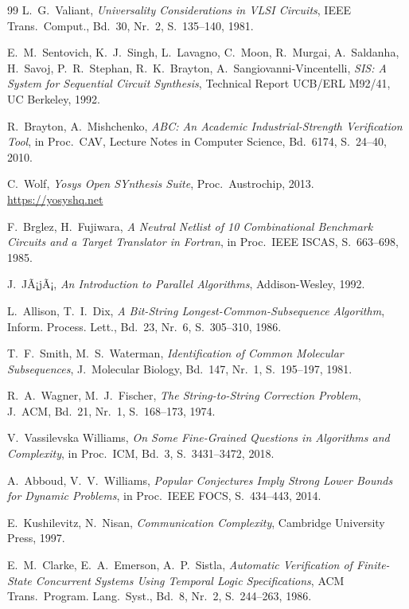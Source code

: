 ﻿\documentclass[a4paper,12pt]{article}
\theoremstyle{definition}
\begin{document}
\begin{thebibliography}{99}
L.~G.~Valiant,
\emph{Universality Considerations in VLSI Circuits},
IEEE Trans.~Comput., Bd.~30, Nr.~2, S.~135--140, 1981.

E.~M.~Sentovich, K.~J.~Singh, L.~Lavagno, C.~Moon, R.~Murgai,
A.~Saldanha, H.~Savoj, P.~R.~Stephan, R.~K.~Brayton, A.~Sangiovanni-Vincentelli,
\emph{SIS: A System for Sequential Circuit Synthesis},
Technical Report UCB/ERL M92/41, UC Berkeley, 1992.

R.~Brayton, A.~Mishchenko,
\emph{ABC: An Academic Industrial-Strength Verification Tool},
in Proc.~CAV, Lecture Notes in Computer Science, Bd.~6174, S.~24--40, 2010.

C.~Wolf,
\emph{Yosys Open SYnthesis Suite},
Proc.~Austrochip, 2013.
\url{https://yosyshq.net}

F.~Brglez, H.~Fujiwara,
\emph{A Neutral Netlist of 10 Combinational Benchmark Circuits and a Target
Translator in Fortran},
in Proc.~IEEE ISCAS, S.~663--698, 1985.

J.~JÃ¡jÃ¡,
\emph{An Introduction to Parallel Algorithms},
Addison-Wesley, 1992.

L.~Allison, T.~I.~Dix,
\emph{A Bit-String Longest-Common-Subsequence Algorithm},
Inform. Process. Lett., Bd.~23, Nr.~6, S.~305--310, 1986.

T.~F.~Smith, M.~S.~Waterman,
\emph{Identification of Common Molecular Subsequences},
J.~Molecular Biology, Bd.~147, Nr.~1, S.~195--197, 1981.

R.~A.~Wagner, M.~J.~Fischer,
\emph{The String-to-String Correction Problem},
J.~ACM, Bd.~21, Nr.~1, S.~168--173, 1974.

V.~Vassilevska Williams,
\emph{On Some Fine-Grained Questions in Algorithms and Complexity},
in Proc.~ICM, Bd.~3, S.~3431--3472, 2018.

A.~Abboud, V.~V.~Williams,
\emph{Popular Conjectures Imply Strong Lower Bounds for Dynamic Problems},
in Proc.~IEEE FOCS, S.~434--443, 2014.

E.~Kushilevitz, N.~Nisan,
\emph{Communication Complexity},
Cambridge University Press, 1997.

E.~M.~Clarke, E.~A.~Emerson, A.~P.~Sistla,
\emph{Automatic Verification of Finite-State Concurrent Systems Using
Temporal Logic Specifications},
ACM Trans.~Program. Lang.~Syst., Bd.~8, Nr.~2, S.~244--263, 1986.


\end{thebibliography}
\end{document}
